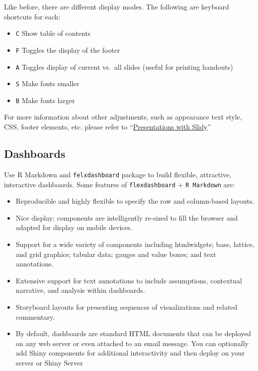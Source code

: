 \documentclass[
]{article}
\providecommand{\tightlist}{%
  \setlength{\itemsep}{0pt}\setlength{\parskip}{0pt}}
\begin{document}
Like before, there are different display modes. The following are
keyboard shortcuts for each:

\begin{itemize}
\tightlist
\item
  \texttt{C} Show table of contents
\item
  \texttt{F} Toggles the display of the footer
\item
  \texttt{A} Toggles display of current vs.~all slides (useful for
  printing handouts)
\item
  \texttt{S} Make fonts smaller
\item
  \texttt{B} Make fonts larger
\end{itemize}

For more information about other adjustments, such as appearance text
style, CSS, footer elements, etc. please refer to
``\href{http://rmarkdown.rstudio.com/slidy_presentation_format.html\#display_modes}{Presentations
with Slidy}''

\hypertarget{dashboards}{%
\subsection{Dashboards}\label{dashboards}}

Use R Markdown and \texttt{felxdashboard} package to build flexible,
attractive, interactive dashboards. Some features of
\texttt{flexdashboard} + \texttt{R\ Markdown} are:

\begin{itemize}
\item
  Reproducible and highly flexible to specify the row and column-based
  layouts.
\item
  Nice display: components are intelligently re-sized to fill the
  browser and adapted for display on mobile devices.
\item
  Support for a wide variety of components including htmlwidgets; base,
  lattice, and grid graphics; tabular data; gauges and value boxes; and
  text annotations.
\item
  Extensive support for text annotations to include assumptions,
  contextual narrative, and analysis within dashboards.
\item
  Storyboard layouts for presenting sequences of visualizations and
  related commentary.
\item
  By default, dashboards are standard HTML documents that can be
  deployed on any web server or even attached to an email message. You
  can optionally add Shiny components for additional interactivity and
  then deploy on your server or Shiny Server
\end{itemize}
\end{document}
